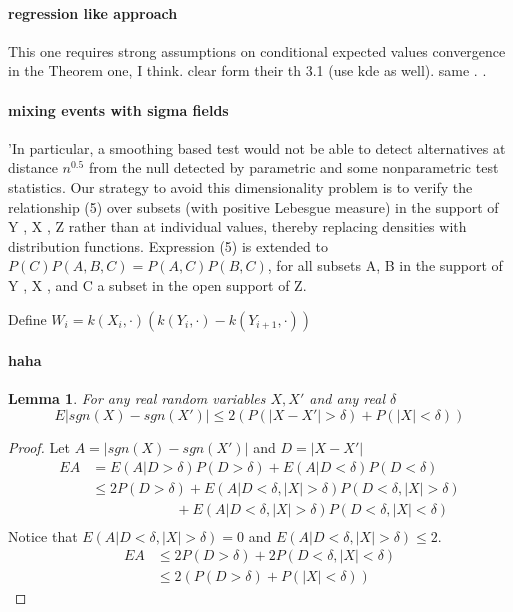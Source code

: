 \documentclass{article}
\newtheorem{lemma}{Lemma}
\begin{document}
\paragraph{regression like approach}
This one \cite{song2007testing} requires strong assumptions on conditional  expected values convergence in the Theorem one, I think. \cite{su2008nonparametric} clear form their th 3.1 (use kde as well). same \cite{fukumizu2007kernel,zhang2012kernel}.
\cite{huang2010testing}.


\paragraph{mixing events with sigma fields}
\cite{gyorfi2012strongly}


\cite{linton1996conditional} 'In particular, a smoothing based test would not be able to detect
alternatives at distance $n^{0.5}$ from the null detected by parametric and
some nonparametric test statistics.
Our strategy to avoid this dimensionality problem is to verify the
relationship (5) over subsets (with positive Lebesgue measure) in the
support of Y , X , Z rather than at individual values, thereby replacing
densities with distribution functions. Expression (5) is extended to
$P (C )P (A,B, C ) = P (A,C )P (B,C )$,
for all subsets A, B in the support of Y , X , and C a subset in the open
support of Z.


Define 
$W_i = k(X_i,\cdot)(k(Y_i,\cdot) - k(Y_{i+1},\cdot))$

 \paragraph{haha}

 \begin{lemma}
\label{lem:bnd}
For any real random variables $X,X'$ and any real $\delta$
\[
E \left |   sgn(X) - sgn(X') \right | \leq 2( P(|X-X'|>\delta) + P(|X|<\delta))
\]
\end{lemma} 
\begin{proof}
Let $A =|sgn(X) - sgn(X')|$ and $D = |X-X'|$ 
\begin{align*}
E A &= E( A  \big | D>\delta) P(D>\delta) + E( A | D<\delta) P(D<\delta)  \\
& \leq 2 P(D>\delta) +  E( A |  D<\delta, |X|>\delta) P(D<\delta, |X|>\delta) \\
 & \quad \quad\quad\quad\quad \quad + E( A |  D<\delta, |X|>\delta) P(D<\delta, |X|<\delta) \\
\end{align*}
Notice that $E( A |  D<\delta, |X|>\delta)  =0$ and $ E( A |  D<\delta, |X|>\delta) \leq 2$.
 \begin{align*}
E A  & \leq  2P(D>\delta)  + 2P(D<\delta, |X|<\delta) \\
& \leq 2( P(D>\delta) + P(|X|<\delta))
 \end{align*}
\end{proof}
\end{document}
